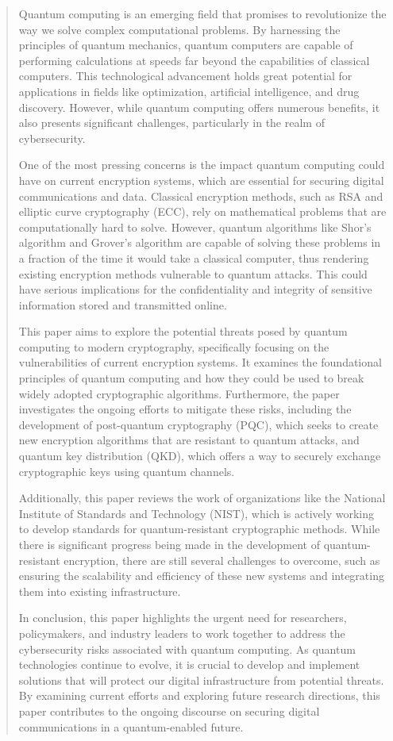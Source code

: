 \documentclass[conference]{IEEEtran}
\begin{document}
\begin{abstract}
    Quantum computing is an emerging field that promises to revolutionize the way we solve complex computational problems. By harnessing the principles of quantum mechanics, quantum computers are capable of performing calculations at speeds far beyond the capabilities of classical computers. This technological advancement holds great potential for applications in fields like optimization, artificial intelligence, and drug discovery. However, while quantum computing offers numerous benefits, it also presents significant challenges, particularly in the realm of cybersecurity. 

    One of the most pressing concerns is the impact quantum computing could have on current encryption systems, which are essential for securing digital communications and data. Classical encryption methods, such as RSA and elliptic curve cryptography (ECC), rely on mathematical problems that are computationally hard to solve. However, quantum algorithms like Shor's algorithm and Grover's algorithm are capable of solving these problems in a fraction of the time it would take a classical computer, thus rendering existing encryption methods vulnerable to quantum attacks. This could have serious implications for the confidentiality and integrity of sensitive information stored and transmitted online.
    
    This paper aims to explore the potential threats posed by quantum computing to modern cryptography, specifically focusing on the vulnerabilities of current encryption systems. It examines the foundational principles of quantum computing and how they could be used to break widely adopted cryptographic algorithms. Furthermore, the paper investigates the ongoing efforts to mitigate these risks, including the development of post-quantum cryptography (PQC), which seeks to create new encryption algorithms that are resistant to quantum attacks, and quantum key distribution (QKD), which offers a way to securely exchange cryptographic keys using quantum channels.
    
    Additionally, this paper reviews the work of organizations like the National Institute of Standards and Technology (NIST), which is actively working to develop standards for quantum-resistant cryptographic methods. While there is significant progress being made in the development of quantum-resistant encryption, there are still several challenges to overcome, such as ensuring the scalability and efficiency of these new systems and integrating them into existing infrastructure.
    
    In conclusion, this paper highlights the urgent need for researchers, policymakers, and industry leaders to work together to address the cybersecurity risks associated with quantum computing. As quantum technologies continue to evolve, it is crucial to develop and implement solutions that will protect our digital infrastructure from potential threats. By examining current efforts and exploring future research directions, this paper contributes to the ongoing discourse on securing digital communications in a quantum-enabled future.
\end{abstract}
\end{document}
